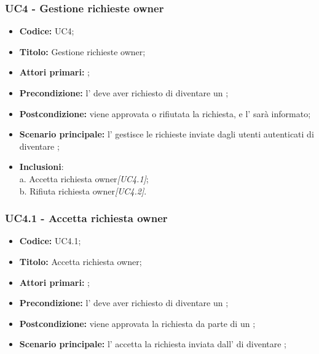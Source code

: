 \documentclass[casi-duso]{subfiles}
\begin{document}

\subsubsection{UC4 - Gestione richieste owner}
\label{subsub:UC4}

\begin{itemize}
  \item \textbf{Codice:} UC4;
  \item \textbf{Titolo:} Gestione richieste owner;
  \item \textbf{Attori primari:} ;
  \item \textbf{Precondizione:} l' deve aver richiesto di diventare un ;
  \item \textbf{Postcondizione:} viene approvata o rifiutata la richiesta, e l' sarà informato;
  \item \textbf{Scenario principale:} l' gestisce le richieste inviate dagli utenti autenticati di diventare ;
  \item \textbf{Inclusioni}:
        \\a. Accetta richiesta owner\emph{[UC4.1]};
        \\b. Rifiuta richiesta owner\emph{[UC4.2]}.
\end{itemize}

\subsubsection{UC4.1 - Accetta richiesta owner}
\label{subsub:UC4.1}

\begin{itemize}
  \item \textbf{Codice:} UC4.1;
  \item \textbf{Titolo:} Accetta richiesta owner;
  \item \textbf{Attori primari:} ;
  \item \textbf{Precondizione:} l' deve aver richiesto di diventare un ;
  \item \textbf{Postcondizione:} viene approvata la richiesta da parte di un ;
  \item \textbf{Scenario principale:} l' accetta la richiesta inviata dall' di diventare ;
\end{itemize}
\end{document}
